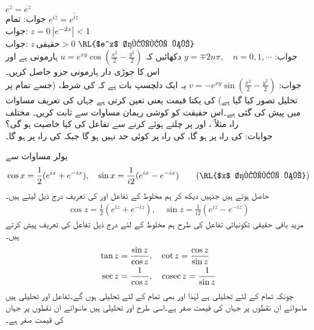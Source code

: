 \quad
$e^{\bar{z}}=\overline{e^z}$\\
جواب:\quad
تمام 
\quad
$e^{i\bar{z}}=\overline{e^{iz}}$\\
جواب:\quad
$z=0$
\quad
$\abs{e^{-2z}}<1$\\
جواب:\quad
$z\,\text{حقیقی}>0$
\quad
$\text{\RL{$e^z$ حقیقی ہے}}$\\
جواب:\quad
$y=\mp 2n\pi,\quad n=0,1,\cdots$
\quad
دکھائیں کہ 
$u=e^{xy}\cos(\tfrac{x^2}{2}-\tfrac{y^2}{2})$
ہارمونی ہے اور اس کا جوڑی دار  ہارمونی جزو حاصل کریں۔\\
جواب:\quad
$v=-e^{xy}\sin(\tfrac{x^2}{2}-\tfrac{y^2}{2})$
\quad
یہ ایک دلچسپ بات ہے کہ  کی شرط،  (جسے تمام  پر تحلیل تصور کیا گیا ہے) کی یکتا قیمت یعنی  تعین کرتی ہے جہاں  کی تعریف مساوات  میں پیش کی گئی ہے۔اس حقیقت کو کوشی ریمان مساوات سے ثابت کریں۔
\quad
مختلف راہ مثلاً ،  اور  پر چلتے ہوئے    کرنے سے  تفاعل  کی کیا خاصیت ہو گی؟ \\
جوابات:\quad {} کی راہ  پر  ہو گا،  کی راہ  پر کوئی حد نہیں ہو گا جبکہ  کی راہ  پر  ہو گا۔

یولر مساوات  سے
\begin{align*}
\cos x=\frac{1}{2}(e^{ix}+e^{-ix}),\quad \sin x=\frac{1}{i2}(e^{ix}-e^{-ix})\quad \quad (\text{\RL{$x$ حقیقی ہے}})
\end{align*}
حاصل ہوتے ہیں جنہیں دیکھ کر ہم مخلوط  کے تفاعل  اور  کی تعریف درج ذیل لیتے ہیں۔
\begin{align}\label{مساوات_مخلوط_ہذلولی_تعریف_الف}
\cos z=\frac{1}{2}(e^{iz}+e^{-iz}),\quad \sin z=\frac{1}{i2}(e^{iz}-e^{-iz})
\end{align}
مزید باقی حقیقی تکونیاتی تفاعل کی طرح ہم مخلوط  کے لئے درج ذیل  تفاعل کی تعریف پیش کرتے ہیں۔ 
\begin{align}
\tan z&=\frac{\sin z}{\cos z},\quad \cot z=\frac{\cos z}{\sin z}\label{مساوات_مخلوط_ہذلولی_تعریف_ب}\\
\sec z&=\frac{1}{\cos z},\quad \operatorname{cosec} z=\frac{1}{\sin z}\label{مساوات_مخلوط_ہذلولی_تعریف_پ}
\end{align}
چونکہ  تمام  کے لئے تحلیلی ہے لہٰذا  اور  بھی تمام  کے لئے تحلیلی ہوں گے۔تفاعل  اور  تحلیلی ہیں ماسوائے ان نقطوں پر جہاں  کی قیمت صفر ہے۔اسی طرح   اور  تحلیلی ہیں ماسوائے ان نقطوں پر جہاں  کی قیمت صفر ہے۔


